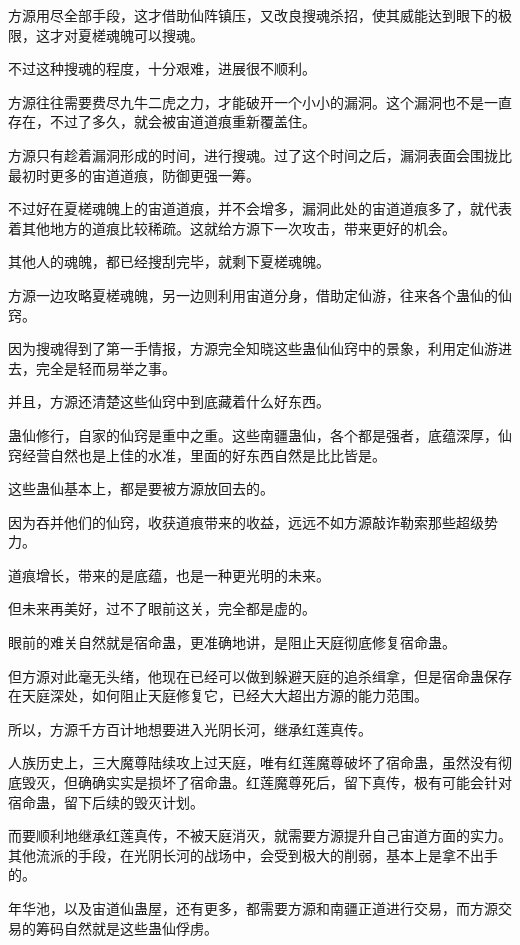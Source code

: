 \begin{this_body}
方源用尽全部手段，这才借助仙阵镇压，又改良搜魂杀招，使其威能达到眼下的极限，这才对夏槎魂魄可以搜魂。

不过这种搜魂的程度，十分艰难，进展很不顺利。

方源往往需要费尽九牛二虎之力，才能破开一个小小的漏洞。这个漏洞也不是一直存在，不过了多久，就会被宙道道痕重新覆盖住。

方源只有趁着漏洞形成的时间，进行搜魂。过了这个时间之后，漏洞表面会围拢比最初时更多的宙道道痕，防御更强一筹。

不过好在夏槎魂魄上的宙道道痕，并不会增多，漏洞此处的宙道道痕多了，就代表着其他地方的道痕比较稀疏。这就给方源下一次攻击，带来更好的机会。

其他人的魂魄，都已经搜刮完毕，就剩下夏槎魂魄。

方源一边攻略夏槎魂魄，另一边则利用宙道分身，借助定仙游，往来各个蛊仙的仙窍。

因为搜魂得到了第一手情报，方源完全知晓这些蛊仙仙窍中的景象，利用定仙游进去，完全是轻而易举之事。

并且，方源还清楚这些仙窍中到底藏着什么好东西。

蛊仙修行，自家的仙窍是重中之重。这些南疆蛊仙，各个都是强者，底蕴深厚，仙窍经营自然也是上佳的水准，里面的好东西自然是比比皆是。

这些蛊仙基本上，都是要被方源放回去的。

因为吞并他们的仙窍，收获道痕带来的收益，远远不如方源敲诈勒索那些超级势力。

道痕增长，带来的是底蕴，也是一种更光明的未来。

但未来再美好，过不了眼前这关，完全都是虚的。

眼前的难关自然就是宿命蛊，更准确地讲，是阻止天庭彻底修复宿命蛊。

但方源对此毫无头绪，他现在已经可以做到躲避天庭的追杀缉拿，但是宿命蛊保存在天庭深处，如何阻止天庭修复它，已经大大超出方源的能力范围。

所以，方源千方百计地想要进入光阴长河，继承红莲真传。

人族历史上，三大魔尊陆续攻上过天庭，唯有红莲魔尊破坏了宿命蛊，虽然没有彻底毁灭，但确确实实是损坏了宿命蛊。红莲魔尊死后，留下真传，极有可能会针对宿命蛊，留下后续的毁灭计划。

而要顺利地继承红莲真传，不被天庭消灭，就需要方源提升自己宙道方面的实力。其他流派的手段，在光阴长河的战场中，会受到极大的削弱，基本上是拿不出手的。

年华池，以及宙道仙蛊屋，还有更多，都需要方源和南疆正道进行交易，而方源交易的筹码自然就是这些蛊仙俘虏。


\end{this_body}
